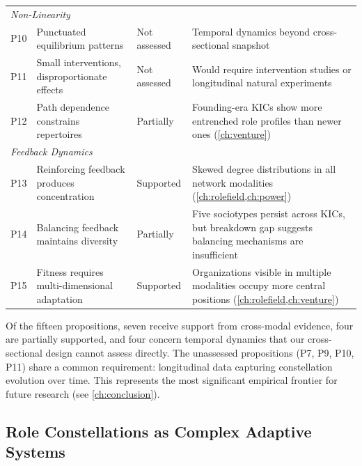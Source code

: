\documentclass[../main.tex]{subfiles}
\begin{document}
\begin{center}
\begin{tabular}{@{}p{0.4cm}p{4.8cm}p{1.5cm}p{5cm}@{}}
\midrule
\multicolumn{4}{l}{\textit{Non-Linearity}} \\
\addlinespace
P10 & Punctuated equilibrium patterns & Not assessed & Temporal dynamics beyond cross-sectional snapshot \\
\addlinespace
P11 & Small interventions, disproportionate effects & Not assessed & Would require intervention studies or longitudinal natural experiments \\
\addlinespace
P12 & Path dependence constrains repertoires & Partially & Founding-era KICs show more entrenched role profiles than newer ones (\cref{ch:venture}) \\
\midrule
\multicolumn{4}{l}{\textit{Feedback Dynamics}} \\
\addlinespace
P13 & Reinforcing feedback produces concentration & Supported & Skewed degree distributions in all network modalities (\cref{ch:rolefield,ch:power}) \\
\addlinespace
P14 & Balancing feedback maintains diversity & Partially & Five sociotypes persist across KICs, but breakdown gap suggests balancing mechanisms are insufficient \\
\addlinespace
P15 & Fitness requires multi-dimensional adaptation & Supported & Organizations visible in multiple modalities occupy more central positions (\cref{ch:rolefield,ch:venture}) \\
\bottomrule
\end{tabular}
\end{center}

Of the fifteen propositions, seven receive support from cross-modal evidence, four are partially supported, and four concern temporal dynamics that our cross-sectional design cannot assess directly. The unassessed propositions (P7, P9, P10, P11) share a common requirement: longitudinal data capturing constellation evolution over time. This represents the most significant empirical frontier for future research (see \cref{ch:conclusion}).

\subsection{Role Constellations as Complex Adaptive Systems}
\end{document}
